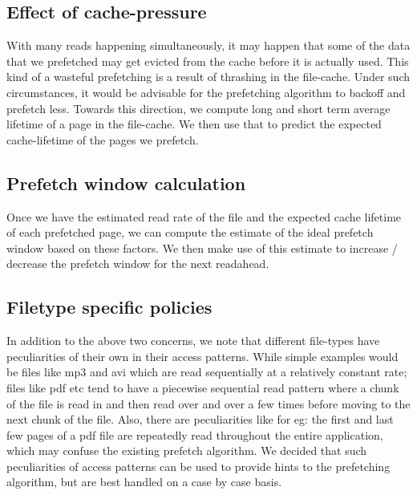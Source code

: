 \documentclass[twocolumn,10pt]{article}
\begin{document}
\subsection{Effect of cache-pressure}
With many reads happening simultaneously, it may happen that some of the data that
we prefetched may get evicted from the cache before it is actually used. This kind of 
a wasteful prefetching is a result of thrashing in the file-cache. Under such
circumstances, it would be advisable for the prefetching algorithm to backoff and prefetch
less. Towards this direction, we compute long and short term average lifetime of a 
page in the file-cache. We then use that to predict the expected cache-lifetime of the
pages we prefetch.

\subsection{Prefetch window calculation}
Once we have the estimated read rate of the file and the expected cache lifetime of
each prefetched page, we can compute the estimate of the ideal prefetch window based
on these factors. We then make use of this estimate to increase / decrease the 
prefetch window for the next readahead.

\subsection{Filetype specific policies}
In addition to the above two concerns, we note that different file-types have peculiarities
of their own in their access patterns. While simple examples would be files like mp3 and
avi which are read sequentially at a relatively constant rate; files like pdf etc tend to
have a piecewise sequential read pattern where a chunk of the file is read in and then read
over and over a few times before moving to the next chunk of the file. Also, there are
peculiarities like for eg: the first and last few pages of a pdf file are repeatedly read
throughout the entire application, which may confuse the existing prefetch algorithm. 
We decided that such peculiarities of access patterns can be used to provide hints to the
prefetching algorithm, but are best handled on a case by case basis.
\end{document}
